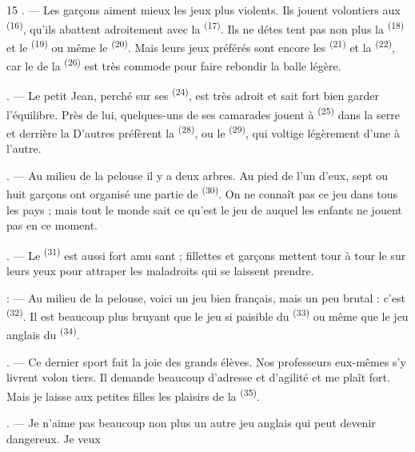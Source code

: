 \begin{VUpage}[17]{15}
. --- Les garçons aiment mieux les jeux plus\nl
violents. Ils jouent volontiers aux  \textsuperscript{(16)}, qu'ils\nl
abattent adroitement avec la  \textsuperscript{(17)}. Ils ne détes\cc
tent pas non plus la  \textsuperscript{(18)} et le  \textsuperscript{(19)}\nl
ou même le  \textsuperscript{(20)}. Mais leurs jeux\nl
préférés sont encore les  \textsuperscript{(21)} et la \nl
{} \textsuperscript{(22)}, car le  de la  \textsuperscript{(26)} est très commode\nl
pour faire rebondir la balle légère.

. --- Le petit Jean, perché sur ses  \textsuperscript{(24)},\nl
est très adroit et sait fort bien garder l'équilibre.\nl
Près de lui, quelques-uns de ses camarades jouent à\nl
{} \textsuperscript{(25)} dans la serre et derrière la \nl
D'autres préfèrent la  \textsuperscript{(28)}, ou le \cc
{} \textsuperscript{(29)}, qui voltige légèrement d'une  à\nl
l'autre.

. --- Au milieu de la pelouse il y a deux arbres.\nl
Au pied de l'un d'eux, sept ou huit garçons ont\nl
organisé une partie de  \textsuperscript{(30)}. On ne\nl
connaît pas ce jeu dans tous les pays ; mais tout le\nl
monde sait ce qu'est le jeu de  auquel\nl
les enfants ne jouent pas en ce moment.

. --- Le  \textsuperscript{(31)} est aussi fort amu\cc
sant ; fillettes et garçons mettent tour à tour le\nl
{} sur leurs yeux pour attraper les maladroits\nl
qui se laissent prendre.

: --- Au milieu de la pelouse, voici un jeu bien\nl
français, mais un peu brutal : c'est  \textsuperscript{(32)}. Il est\nl
beaucoup plus bruyant que le jeu si paisible du \cc
{} \textsuperscript{(33)} ou même que le jeu anglais du \cc
{} \textsuperscript{(34)}.

. --- Ce dernier sport fait la joie des grands\nl
élèves. Nos professeurs eux-mêmes s'y livrent volon\cc
tiers. Il demande beaucoup d'adresse et d'agilité et me\nl
plaît fort. Mais je laisse aux petites filles les plaisirs\nl
de la  \textsuperscript{(35)}.

. --- Je n'aime pas beaucoup non plus un autre\nl
jeu anglais qui peut devenir dangereux. Je veux
\parplein
\end{VUpage}


